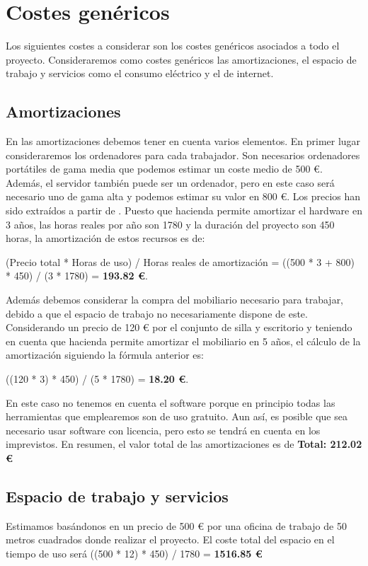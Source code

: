 \section{Costes genéricos}
Los siguientes costes a considerar son los costes genéricos asociados a todo el proyecto. Consideraremos como costes genéricos las amortizaciones, el espacio de trabajo y servicios como el consumo eléctrico y el de internet.

\subsection*{Amortizaciones}
En las amortizaciones debemos tener en cuenta varios elementos. En primer lugar consideraremos los ordenadores para cada trabajador. Son necesarios ordenadores portátiles de gama media que podemos estimar un coste medio de 500 €. Además, el servidor también puede ser un ordenador, pero en este caso será necesario uno de gama alta y podemos estimar su valor en 800 €. Los precios han sido extraídos a partir de \cite{mediamark}. Puesto que hacienda permite amortizar el hardware en 3 años, las horas reales por año son 1780 y la duración del proyecto son 450 horas, la amortización de estos recursos es de:

(Precio total * Horas de uso) / Horas reales de amortización = ((500 * 3 + 800) * 450) / (3 * 1780) = \textbf{193.82 €}.  

Además debemos considerar la compra del mobiliario necesario para trabajar, debido a que el espacio de trabajo no necesariamente dispone de este. Considerando un precio de 120 € por el conjunto de silla y escritorio \cite{ikea} y teniendo en cuenta que hacienda permite amortizar el mobiliario en 5 años, el cálculo de la amortización siguiendo la fórmula anterior es:  

((120 * 3) * 450) / (5 * 1780) = \textbf{18.20 €}. 

En este caso no tenemos en cuenta el software porque en principio todas las herramientas que emplearemos son de uso gratuito. Aun así, es posible que sea necesario usar software con licencia, pero esto se tendrá en cuenta en los imprevistos. En resumen, el valor total de las amortizaciones es de \textbf{Total: 212.02 €}

\subsection*{Espacio de trabajo y servicios}
Estimamos basándonos en \cite{oficinas} un precio de 500 € por una oficina de trabajo de 50 metros cuadrados donde realizar el proyecto. El coste total del espacio en el tiempo de uso será ((500 * 12) * 450) / 1780 = \textbf{1516.85 €}  

